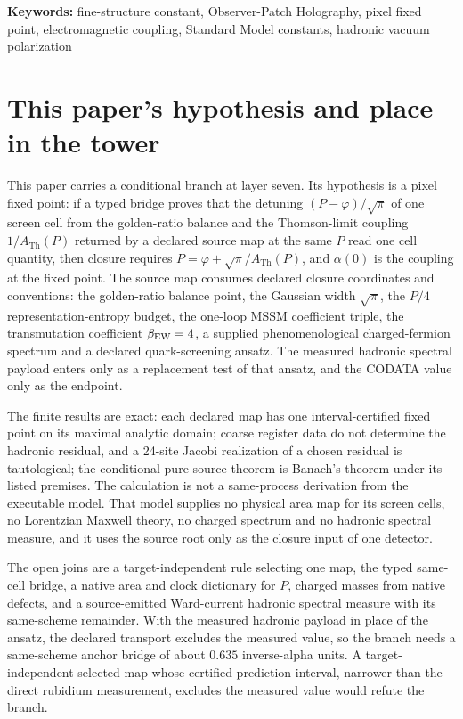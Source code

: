 \documentclass[11pt]{article}
\theoremstyle{remark}
\newcommand{\ATh}{A_{\mathrm{Th}}}
\begin{document}
\noindent\textbf{Keywords:} fine-structure constant, Observer-Patch Holography, pixel fixed
point, electromagnetic coupling, Standard Model constants, hadronic vacuum polarization



\section*{This paper's hypothesis and place in the tower}

This paper carries a conditional branch at layer seven. Its hypothesis is a
pixel fixed point: if a typed bridge proves that the detuning
\((P-\varphi)/\sqrt\pi\) of one screen cell from the golden-ratio balance
and the Thomson-limit coupling \(1/\ATh(P)\) returned by a declared source
map at the same \(P\) read one cell quantity, then closure requires
\(P=\varphi+\sqrt\pi/\ATh(P)\), and \(\alpha(0)\) is the coupling at the
fixed point. The source map consumes declared closure coordinates and
conventions: the golden-ratio balance point, the Gaussian width
\(\sqrt\pi\), the \(P/4\) representation-entropy budget, the one-loop MSSM
coefficient triple, the transmutation coefficient \(\beta_{\rm EW}=4\), a
supplied phenomenological charged-fermion spectrum and a declared
quark-screening ansatz. The measured hadronic spectral payload enters only
as a replacement test of that ansatz, and the CODATA value only as the
endpoint.

The finite results are exact: each declared map has one interval-certified
fixed point on its maximal analytic domain; coarse register data do not
determine the hadronic residual, and a 24-site Jacobi realization of a
chosen residual is tautological; the conditional pure-source theorem is
Banach's theorem under its listed premises. The calculation is not a
same-process derivation from the executable model. That model supplies no
physical area map for its screen cells, no Lorentzian Maxwell theory, no
charged spectrum and no hadronic spectral measure, and it uses the source
root only as the closure input of one detector.

The open joins are a target-independent rule selecting one map, the typed
same-cell bridge, a native area and clock dictionary for \(P\), charged
masses from native defects, and a source-emitted Ward-current hadronic
spectral measure with its same-scheme remainder. With the measured hadronic
payload in place of the ansatz, the declared transport excludes the
measured value, so the branch needs a same-scheme anchor bridge of about
\(0.635\) inverse-alpha units. A target-independent selected map whose
certified prediction interval, narrower than the direct rubidium
measurement, excludes the measured value would refute the branch.
\end{document}

